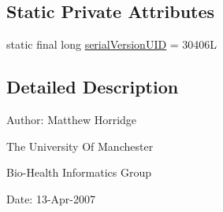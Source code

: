 \subsection*{Static Private Attributes}
\begin{DoxyCompactItemize}
\item 
static final long \hyperlink{classorg_1_1coode_1_1owlapi_1_1rdfxml_1_1parser_1_1_o_w_l_r_d_f_parser_exception_abab32617131a1040f6981963e708a13b}{serial\-Version\-U\-I\-D} = 30406\-L
\end{DoxyCompactItemize}


\subsection{Detailed Description}
Author\-: Matthew Horridge\par
 The University Of Manchester\par
 Bio-\/\-Health Informatics Group\par
 Date\-: 13-\/\-Apr-\/2007\par
\par
 


